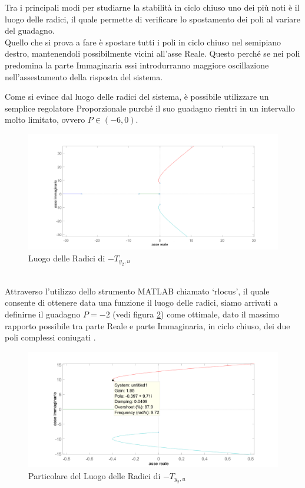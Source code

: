 Tra i principali modi per studiarne la stabilità in ciclo chiuso uno dei più noti è il luogo delle radici, il quale permette di verificare lo spostamento dei poli al variare del guadagno.\\
Quello che si prova a fare è spostare tutti i poli in ciclo chiuso nel semipiano destro, mantenendoli possibilmente vicini all'asse Reale.
Questo perché se nei poli predomina la parte Immaginaria essi introdurranno maggiore oscillazione nell'assestamento della risposta del sistema. 

Come si evince dal luogo delle radici del sistema, è possibile utilizzare un semplice regolatore Proporzionale purché il suo guadagno rientri in un intervallo molto limitato, ovvero $P\in(-6,0)$.
\begin{figure}[ht]
	\centering
	\includegraphics[width=\textwidth]{RLocusPendoloNormale.PNG}
	\caption{Luogo delle Radici di $-T_{y_2,u}$}
	\label{RLocusPendoloNormale}
\end{figure}
\\Attraverso l'utilizzo dello strumento MATLAB chiamato `rlocus', il quale consente di ottenere data una funzione il luogo delle radici, siamo arrivati a definirne il guadagno $P=-2$ (vedi figura \ref{gainOttimaleft}) come ottimale, dato il massimo rapporto possibile tra parte Reale e parte Immaginaria, in ciclo chiuso, dei due poli complessi coniugati .
\begin{figure}[ht]
	\centering
	\includegraphics[width=\textwidth]{gainOttimaleft.PNG}
	\caption{Particolare del Luogo delle Radici di $-T_{y_2,u}$}
	\label{gainOttimaleft}
\end{figure}
